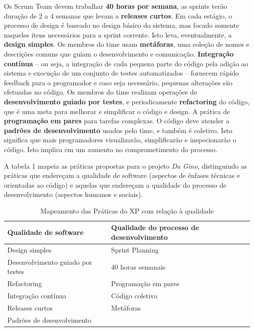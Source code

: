 Os Scrum Team devem trabalhar \textbf{40 horas por semana}, as sprints terão duração de 2 a 4 semanas que levam a \textbf{releases curtos}. Em cada estágio, o processo de design é baseado no design básico do sistema, mas focado somente naqueles itens necessários para a sprint corrente. Isto leva, eventualmente, a \textbf{design simples}. Os membros do time usam \textbf{metáforas}, uma coleção de nomes e descrições comuns que guiam o desenvolvimento e comunicação. \textbf{Integração contínua} – ou seja, a integração de cada pequena parte do código pela adição ao sistema e execução de um conjunto de testes automatizados – fornecem rápido feedback para o programador e caso seja necessário, pequenas alterações são efetuadas no código. Os membros do time realizam operações de \textbf{desenvolvimento guiado por testes}, e periodicamente \textbf{refactoring} do código, que é uma meta para melhorar e simplificar o código e design. A prática de \textbf{programação em pares} para tarefas complexas. O código deve atender a \textbf{padrões de desenvolvimento} usados pelo time, e também é coletivo. Isto significa que mais programadores visualizarão, simplificarão e inspecionarão o código. Isto implica em um aumento no comprometimento do processo.

A tabela 1 mapeia as práticas propostas para o projeto \textit{Da Gino}, distinguindo as práticas que endereçam a qualidade de software (aspectos de ênfases técnicas e orientadas ao código) e aquelas que endereçam a qualidade do processo de desenvolvimento (aspectos humanos e sociais).

\begin{table}[htb]
      \begin{center}
        \begin{tabular}{| p{6cm} | p{6cm} |}
        \hline
        \textbf{Qualidade de software} & \textbf{Qualidade do processo de desenvolvimento}  \\ \hline
        Design simples & Sprint Planning \\ \hline
        Desenvolvimento guiado por testes & 40 horas semanais \\ \hline
        Refactoring & Programação em pares \\ \hline
        Integração contínua & Código coletivo \\ \hline
        Releases curtos & Metáforas \\ \hline
        Padrões de desenvolvimento &  \\ \hline
        
        
        \end{tabular}
      \end{center}
    \caption{Mapeamento das Práticas do XP com relação à qualidade}
    \end{table}

